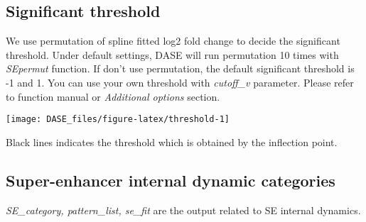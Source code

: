 \documentclass[
]{article}
\newenvironment{Shaded}{\begin{snugshade}}{\end{snugshade}}
\newcommand{\CommentTok}[1]{\textcolor[rgb]{0.56,0.35,0.01}{\textit{#1}}}
\newcommand{\NormalTok}[1]{#1}
\newcommand{\SpecialCharTok}[1]{\textcolor[rgb]{0.00,0.00,0.00}{#1}}
\begin{document}
\hypertarget{significant-threshold}{%
\subsection{Significant threshold}\label{significant-threshold}}

We use permutation of spline fitted log2 fold change to decide the
significant threshold. Under default settings, DASE will run permutation
10 times with \emph{SEpermut} function. If don't use permutation, the
default significant threshold is -1 and 1. You can use your own
threshold with \emph{cutoff\_v} parameter. Please refer to function
manual or \emph{Additional options} section.

\begin{Shaded}
\end{Shaded}

\begin{center}\texttt{[image: DASE\_files/figure-latex/threshold-1]} \end{center}

Black lines indicates the threshold which is obtained by the inflection
point.

\hypertarget{super-enhancer-internal-dynamic-categories}{%
\subsection{Super-enhancer internal dynamic
categories}\label{super-enhancer-internal-dynamic-categories}}

\emph{SE\_category, pattern\_list, se\_fit} are the output related to SE
internal dynamics.
\end{document}
